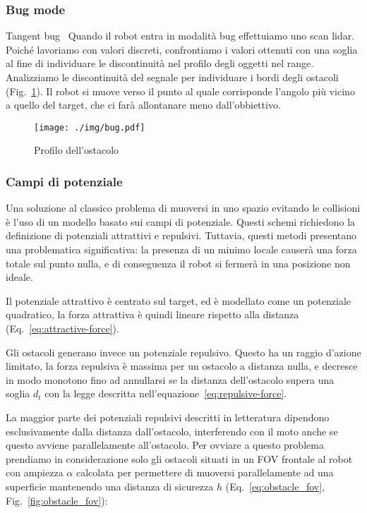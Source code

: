 \documentclass[10pt]{beamer}
\begin{document}
	\subsubsection{Bug mode}\label{subsec:Bug-mode}
	\begin{frame}{Tangent bug~\cite{503814}}
		Quando il robot entra in modalità bug effettuiamo uno scan lidar.
		Poiché lavoriamo con valori discreti, confrontiamo i valori ottenuti
		con una soglia al fine di individuare le discontinuità nel profilo
		degli oggetti nel range. Analizziamo le discontinuità
		del segnale per individuare i bordi degli ostacoli
		(Fig.~\ref{fig:bug}). 
		Il robot si muove verso il punto al quale corrisponde l'angolo più
		vicino a quello del target, che ci farà allontanare meno
		dall'obbiettivo.
		
		\begin{figure}[H]
			\centering
			\texttt{[image: ./img/bug.pdf]}
			\caption{Profilo dell'ostacolo}
			\label{fig:bug}
		\end{figure}
	\end{frame}

	\subsubsection{Campi di potenziale}\label{subsec:Campi-di-potenziale}
	
	Una soluzione al classico problema di muoversi in uno spazio evitando le
	collisioni è l'uso di un modello basato sui campi di potenziale. Questi
	schemi richiedono la definizione di potenziali attrattivi e repulsivi.
	Tuttavia, questi metodi presentano una problematica significativa: la
	presenza di un minimo locale causerà una forza totale sul punto nulla, e di
	conseguenza il robot si fermerà in una posizione non ideale. 

	Il potenziale attrattivo è centrato sul target, ed è modellato come un
	potenziale quadratico, la forza attrattiva è quindi lineare rispetto alla
	distanza (Eq.~\ref{eq:attractive-force}).

	Gli ostacoli generano invece un potenziale repulsivo. Questo ha un raggio
	d'azione limitato, la forza repulsiva è massima per un ostacolo a distanza
	nulla, e decresce in modo monotono fino ad annullarsi se la distanza
	dell'ostacolo supera una soglia $d_t$ con la legge descritta
	nell'equazione~\ref{eq:repulsive-force}.

	La maggior parte dei potenziali repulsivi descritti in letteratura
	dipendono esclusivamente dalla distanza dall'ostacolo, interferendo con il
	moto anche se questo avviene parallelamente all'ostacolo. Per ovviare a
	questo problema prendiamo in considerazione solo gli ostacoli situati in un
	FOV frontale al robot con ampiezza $ \alpha  $ calcolata per permettere di
	muoversi parallelamente ad una superficie mantenendo una distanza di
	sicurezza $ h $ (Eq.~\ref{eq:obstacle_fov}, Fig.~\ref{fig:obstacle_fov}): 
\end{document}
